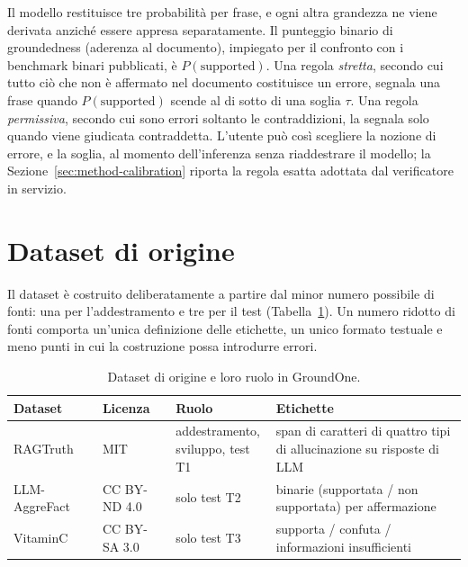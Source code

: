 Il modello restituisce tre probabilità per frase, e ogni altra grandezza ne viene derivata anziché essere appresa
separatamente. Il punteggio binario di groundedness (aderenza al documento), impiegato per il confronto con i benchmark
binari pubblicati, è $P(\text{supported})$. Una regola \emph{stretta}, secondo cui tutto ciò che non è affermato nel
documento costituisce un errore, segnala una frase quando $P(\text{supported})$ scende al di sotto di una soglia $\tau$.
Una regola \emph{permissiva}, secondo cui sono errori soltanto le contraddizioni, la segnala solo quando viene giudicata
contraddetta. L'utente può così scegliere la nozione di errore, e la soglia, al momento dell'inferenza senza
riaddestrare il modello; la Sezione~\ref{sec:method-calibration} riporta la regola esatta adottata dal verificatore in
servizio.

\section{Dataset di origine}
\label{sec:data-sources}

Il dataset è costruito deliberatamente a partire dal minor numero possibile di fonti: una per l'addestramento e tre per
il test (Tabella~\ref{tab:data-sources}). Un numero ridotto di fonti comporta un'unica definizione delle etichette, un
unico formato testuale e meno punti in cui la costruzione possa introdurre errori.

\begin{table}[htbp]
\centering
\caption{Dataset di origine e loro ruolo in GroundOne.}
\label{tab:data-sources}
\small
\begin{tabularx}{\textwidth}{@{}lllX@{}}
\toprule
Dataset & Licenza & Ruolo & Etichette \\
\midrule
RAGTruth~\cite{niu2024ragtruth} & MIT & \makecell[l]{addestramento,\\ sviluppo, test T1} & span di caratteri di quattro tipi di allucinazione su risposte di LLM \\
LLM-AggreFact~\cite{tang2024minicheck,llmaggrefact} & CC BY-ND 4.0 & solo test T2 & binarie (supportata / non supportata) per affermazione \\
VitaminC~\cite{schuster2021vitaminc} & CC BY-SA 3.0 & solo test T3 & supporta / confuta / informazioni insufficienti \\
\bottomrule
\end{tabularx}
\end{table}

